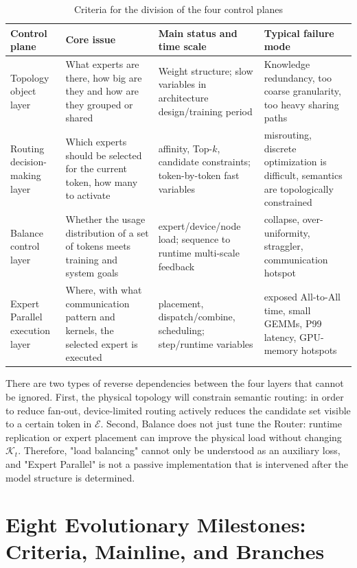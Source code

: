 \documentclass[10pt,a4paper,fontset=none]{ctexart}
\begin{document}
\begin{table}[htbp]
\centering
\caption{Criteria for the division of the four control planes}
\label{en:tab:fourplanes}
\small
\begin{tabularx}{\textwidth}{>{\raggedright\arraybackslash}p{}>{\raggedright\arraybackslash}p{}>{\raggedright\arraybackslash}p{}Y}
\toprule
Control plane & Core issue & Main status and time scale & Typical failure mode \\
\midrule
Topology object layer & What experts are there, how big are they and how are they grouped or shared & Weight structure; slow variables in architecture design/training period & Knowledge redundancy, too coarse granularity, too heavy sharing paths \\
Routing decision-making layer & Which experts should be selected for the current token, how many to activate & affinity, Top-$k$, candidate constraints; token-by-token fast variables & misrouting, discrete optimization is difficult, semantics are topologically constrained \\
Balance control layer & Whether the usage distribution of a set of tokens meets training and system goals & expert/device/node load; sequence to runtime multi-scale feedback & collapse, over-uniformity, straggler, communication hotspot \\
Expert Parallel execution layer & Where, with what communication pattern and kernels, the selected expert is executed & placement, dispatch/combine, scheduling; step/runtime variables & exposed All-to-All time, small GEMMs, P99 latency, GPU-memory hotspots \\
\bottomrule
\end{tabularx}
\end{table}

There are two types of reverse dependencies between the four layers that cannot be ignored. First, the physical topology will constrain semantic routing: in order to reduce fan-out, device-limited routing actively reduces the candidate set visible to a certain token in $\mathcal{E}$. Second, Balance does not just tune the Router: runtime replication or expert placement can improve the physical load without changing $\mathcal{K}_t$. Therefore, "load balancing" cannot only be understood as an auxiliary loss, and "Expert Parallel" is not a passive implementation that is intervened after the model structure is determined.

\section{Eight Evolutionary Milestones: Criteria, Mainline, and Branches}
\end{document}
